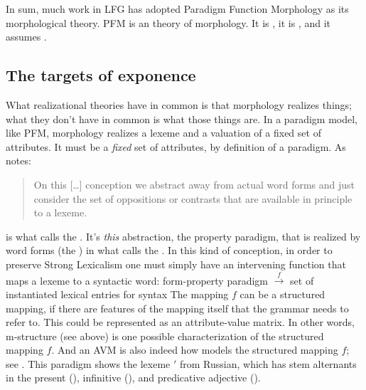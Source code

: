 \documentclass[output=paper,hidelinks]{langscibook}
\begin{document}
In sum, much work in LFG has adopted Paradigm Function Morphology as
its morphological theory. 
PFM is an 
theory of morphology. It is , it is ,
and it assumes .


\subsection{The targets of exponence}

What realizational theories have in common is that morphology realizes
things; what they don't have in common is what those things are. In a
paradigm model, like PFM, morphology realizes a lexeme and a valuation
of a fixed set of attributes. It must be a \emph{fixed} set of
attributes, by definition of a paradigm. As \citet{spencer13} notes:
%
\begin{quote}
  On this [\ldots] conception we abstract away from actual word forms and just
  consider the set of oppositions or contrasts that are available in
  principle to a lexeme.  \citep[9]{spencer13}
\end{quote}
%
 is
what \citet[9]{spencer13} calls the . It's
\emph{this} abstraction, the property paradigm,  that is realized by
word forms (the ) in
what \citeauthor{spencer13} calls the  \citep[9]{spencer13}. In
this kind of conception, in order to preserve Strong Lexicalism one must
simply have an intervening function that maps a lexeme to a syntactic
word: 
\ea \label{ex:spencer-mapping}
  form-property paradigm $\overset{f}{\longrightarrow}$ set of
  instantiated lexical entries for syntax
\z
%
The mapping $f$ can be a structured mapping, if there are features of
the mapping itself that the grammar needs to refer to. This could be
represented as an attribute-value matrix. In other words, m-structure
(see above) is one possible characterization of the structured mapping
$f$. And an AVM is also indeed how \citet{spencer13} models the
structured mapping $f$; see . This paradigm shows
the lexeme $'$  from Russian, which has
stem alternants in the present (), infinitive
(), and predicative adjective ().
\end{document}
